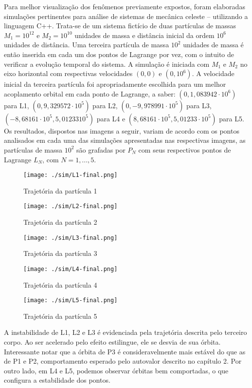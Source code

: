    Para melhor visualização dos fenômenos previamente expostos, foram elaboradas simulações pertinentes para análise de sistemas de mecânica celeste \cite{sashalag, sashaeng} -- utilizando a linguagem C++. Trata-se de um sistema fictício de duas partículas de massas $M_1 = 10^{12}$ e $M_2 = 10^{10}$ unidades de massa e distância inicial da ordem $10^6$ unidades de distância. Uma terceira partícula de massa $10^2$ unidades de massa é então inserida em cada um dos pontos de Lagrange por vez, com o intuito de verificar a evolução temporal do sistema. A simulação é iniciada com $M_1$ e $M_2$ no eixo horizontal com respectivas velocidades $(0,0)$ e $(0, 10^6)$. A velocidade inicial da terceira partícula foi apropriadamente escolhida para um melhor acoplamento orbital em cada ponto de Lagrange, a saber: $(0,1,083942 \cdot 10^6)$ para L1, $(0,9,329572 \cdot 10^5)$ para L2, $(0,-9,978991 \cdot 10^5)$ para L3, $(-8,68161\cdot 10^5, 5,01233 10^5)$ para L4 e $(8,68161\cdot 10^5, 5,01233 \cdot 10^5)$ para L5. Os resultados, dispostos nas imagens a seguir, variam de acordo com os pontos analisados em cada uma das simulações apresentadas nas respectivas imagens, as partículas de massa $10^2$ são grafadas por $P_{N}$ com seus respectivos pontos de Lagrange $L_{N}$, com $N = 1,..., 5$. 
\begin{figure}[h]
\begin{minipage}{0.5\textwidth}
\centering
\texttt{[image: ./sim/L1-final.png]}
\caption{Trajetória da partícula 1}
\end{minipage}
\begin{minipage}{0.5\textwidth}
\centering
\texttt{[image: ./sim/L2-final.png]}
\caption{Trajetória da partícula 2}
\end{minipage}
\end{figure}

\begin{figure}[h]
\begin{minipage}{0.5\textwidth}
\centering
\texttt{[image: ./sim/L3-final.png]}
\caption{Trajetória da partícula 3}
\end{minipage}
\begin{minipage}{0.5\textwidth}
\centering
\texttt{[image: ./sim/L4-final.png]}
\caption{Trajetória da partícula 4}
\end{minipage}
\end{figure}

\begin{figure}[H]
\centering
\texttt{[image: ./sim/L5-final.png]}
\caption{Trajetória da partícula 5}
\end{figure}

   A instabilidade de L1, L2 e L3 é evidenciada pela trajetória descrita pelo terceiro corpo. Ao ser acelerado pelo efeito estilingue, ele se desvia de sua órbita. Interessante notar que a órbita de P3 é consideravelmente mais estável do que as de P1 e P2, comportamento esperado pelo autovalor descrito no capítulo 2. Por outro lado, em L4 e L5, podemos observar órbitas bem comportadas, o que configura a estabilidade dos pontos.
